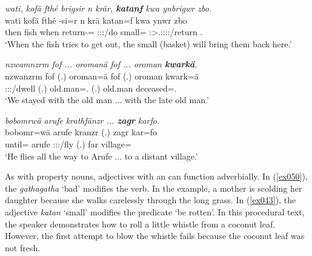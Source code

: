\begin{exe}
	\ex \emph{wati, kofä fthé brigsir n krär, \textbf{katanf} kwa ynbrigwr zbo.}\\
	\gll wati kofä fthé -si=r n krä katan=f kwa ynwr zbo\\
	then fish when return-\Nmlz={\Purp} {\Imn} \Stsg:\Sbj:\Irr:\Pfv/do small={\Erg} {\Fut} \Stsg:\Sbj>\Tsg.\Masc:\Obj:\Nonpast:\Ipfv:\Venit/return {\Prox}.{\All}\\
	\trans `When the fish tries to get out, the small (basket) will bring them back here.' 
	\label{ex048}
\end{exe}
\begin{exe}
	\ex \emph{nzwamnzrm fof ... oromanä fof ... oroman \textbf{kwarkä}.}\\
	\gll nzwanzrm fof (.) oroman=ä fof (.) oroman kwark=ä\\
	\Fsg:\Sbj:\Pst:\Dur/dwell {\Emph} (.) {old.man=\Assoc.\Pl} {\Emph} (.) {old.man} deceased=\Assoc.{\Pl}\\
	\trans `We stayed with the old man ... with the late old man.'
	\label{ex049}
\end{exe}
\begin{exe}
	\ex \emph{bobomrwä arufe krathfänzr ... \textbf{zagr} karfo.}\\
	\gll bobomr=wä arufe kranzr (.) zagr kar=fo\\
	until={\Emph} arufe \Stsg:\Sbj:\Irr:\Ipfv/fly (.) far village=\All\\
	\trans `He flies all the way to Arufe ... to a distant village.'
	\label{ex505}
\end{exe}

As with property nouns, adjectives with an   can function adverbially. In (\ref{ex050}), the  \emph{gathagatha} `bad' modifies the verb. In the example, a mother is scolding her daughter because she walks carelessly through the long grass. In (\ref{ex043}), the adjective \emph{katan} `small' modifies the predicate `be rotten'. In this procedural text, the speaker demonstrates how to roll a little whistle from a coconut leaf. However, the first attempt to blow the whistle fails because the coconut leaf was not fresh.

